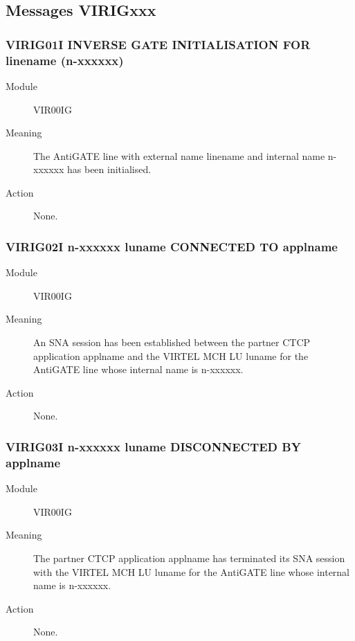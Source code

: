 \documentclass[letterpaper,10pt,english]{sphinxmanual}
\begin{document}
\subsection{Messages VIRIGxxx}
\label{\detokenize{messages:messages-virigxxx}}

\subsubsection{VIRIG01I INVERSE GATE INITIALISATION FOR linename (n-xxxxxx)}
\label{\detokenize{messages:virig01i-inverse-gate-initialisation-for-linename-n-xxxxxx}}\begin{description}
\item[{Module}] \leavevmode
VIR00IG

\item[{Meaning}] \leavevmode
The AntiGATE line with external name linename and internal name n-xxxxxx has been initialised.

\item[{Action}] \leavevmode
None.

\end{description}


\subsubsection{VIRIG02I n-xxxxxx luname CONNECTED TO applname}
\label{\detokenize{messages:virig02i-n-xxxxxx-luname-connected-to-applname}}\begin{description}
\item[{Module}] \leavevmode
VIR00IG

\item[{Meaning}] \leavevmode
An SNA session has been established between the partner CTCP application applname and the VIRTEL MCH LU luname for the AntiGATE line whose internal name is n-xxxxxx.

\item[{Action}] \leavevmode
None.

\end{description}


\subsubsection{VIRIG03I n-xxxxxx luname DISCONNECTED BY applname}
\label{\detokenize{messages:virig03i-n-xxxxxx-luname-disconnected-by-applname}}\begin{description}
\item[{Module}] \leavevmode
VIR00IG

\item[{Meaning}] \leavevmode
The partner CTCP application applname has terminated its SNA session with the VIRTEL MCH LU luname for the AntiGATE line whose internal name is n-xxxxxx.

\item[{Action}] \leavevmode
None.

\end{description}
\end{document}
